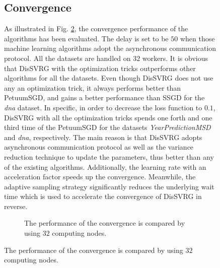 \documentclass[preprint,review,11pt,a4paper]{elsarticle}
\begin{document}
\begin{figure}
\subsection{Convergence}
As illustrated in Fig. \ref{figure_evaluation1_convergence}, the  convergence performance of the algorithms has been evaluated. The delay is set to be $50$ when those machine learning algorithms adopt the asynchronous communication protocol. All the datasets are handled on $32$ workers.  It is obvious that DisSVRG with the optimization tricks outperforms other algorithms for all the datasets. Even though DisSVRG does not use any an optimization trick, it always performs better than PetuumSGD, and gains a better performance than SSGD for the \emph{dna} dataset. In specific, in order to decrease the loss function to $0.1$, DisSVRG with all the optimization tricks spends one forth and one third time of the PetuumSGD for the datasets \emph{YearPredictionMSD} and \emph{dna}, respectively.  The main reason is that DisSVRG adopts asynchronous communication protocol as well as the variance reduction technique to update the parameters, thus better than any of the existing algorithms. Additionally, the  learning rate with an acceleration factor speeds up the convergence. Meanwhile, the adaptive sampling strategy significantly reduces the underlying wait time which is used to accelerate the convergence of DisSVRG in reverse.

\begin{figure}
\centering
{}
\caption{The performance of the convergence is compared by using $32$ computing nodes.}
\label{figure_evaluation1_convergence}
\end{figure}


\end{figure}
\end{document}

